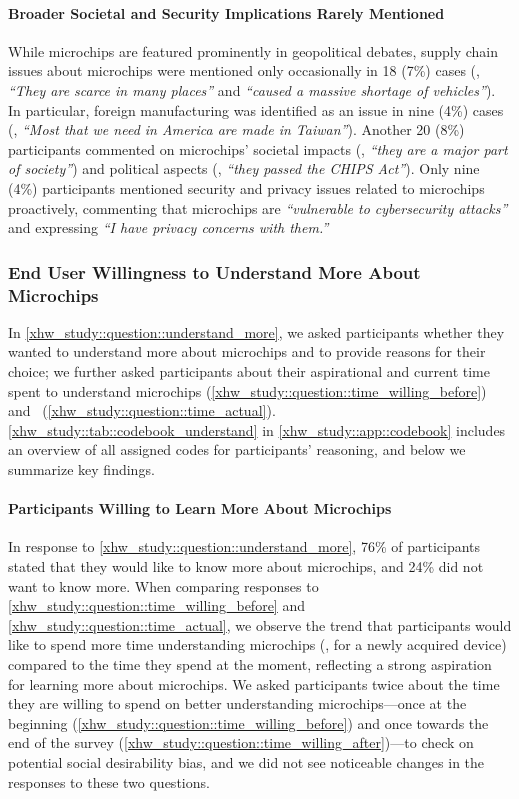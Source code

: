 \paragraph{Broader Societal and Security Implications Rarely Mentioned}
While microchips are featured prominently in geopolitical debates, supply chain issues about microchips were mentioned only occasionally in 18 (7\%) cases (\eg, \textit{\enquote{They are scarce in many places}} and \textit{\enquote{caused a massive shortage of vehicles}}). 
In particular, foreign manufacturing was identified as an issue in nine (4\%) cases (\eg, \textit{\enquote{Most that we need in America are made in Taiwan}}).
Another 20 (8\%) participants commented on microchips' societal impacts (\eg, \textit{\enquote{they are a major part of society}}) and political aspects (\eg, \textit{\enquote{they passed the CHIPS Act}}).
Only nine (4\%) participants mentioned security and privacy issues related to microchips proactively, commenting that microchips are \textit{\enquote{vulnerable to cybersecurity attacks}} and expressing \textit{\enquote{I have privacy concerns with them.}}

\subsubsection{End User Willingness to Understand More About Microchips}
\label{xhw_study::subsubsec::understand_more}
In \autoref{xhw_study::question::understand_more}, we asked participants whether they wanted to understand more about microchips and to provide reasons for their choice; we further asked participants about their aspirational and current time spent to understand microchips (\autoref{xhw_study::question::time_willing_before}) and ~(\autoref{xhw_study::question::time_actual}). \autoref{xhw_study::tab::codebook_understand} in \autoref{xhw_study::app::codebook} includes an overview of all assigned codes for participants' reasoning, and below we summarize key findings.

\paragraph{Participants Willing to Learn More About Microchips} 
In response to \autoref{xhw_study::question::understand_more}, 76\% of participants stated that they would like to know more about microchips, and 24\% did not want to know more.
When comparing responses to \autoref{xhw_study::question::time_willing_before} and \autoref{xhw_study::question::time_actual}, we observe the trend that participants would like to spend more time understanding microchips (\eg, for a newly acquired device) compared to the time they spend at the moment, reflecting a strong aspiration for learning more about microchips.
We asked participants twice about the time they are willing to spend on better understanding microchips---once at the beginning (\autoref{xhw_study::question::time_willing_before}) and once towards the end of the survey (\autoref{xhw_study::question::time_willing_after})---to check on potential social desirability bias, and we did not see noticeable changes in the responses to these two questions.

